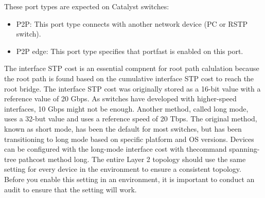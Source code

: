 \documentclass{article}
\begin{document}
These port types are expected on Catalyst switches:
\begin{itemize}
\item P2P: This port type connects with another network device (PC or RSTP switch).
\item P2P edge: This port type specifies that portfast is enabled on this port.
\end{itemize}

The interface STP cost is an essential compnent for root path calulation because the root path is found based on the cumulative interface STP cost to reach the root bridge. The interface STP cost was originally stored as a 16-bit value with a reference value of 20 Gbps. As switches have developed with higher-speed interfaces, 10 Gbps might not be enough. Another method, called long mode, uses a 32-but value and uses a reference speed of 20 Tbps. The original method, known as short mode, has been the default for most switches, but has been transitioning to long mode based on specific platform and OS versions. Devices can be configured with the long-mode interface cost with thecommand spanning-tree pathcost method long. The entire Layer 2 topology should use the same setting for every device in the environment to ensure a consistent topology. Before you enable this setting in an environment, it is important to conduct an audit to ensure that the setting will work.\\
\end{document}
